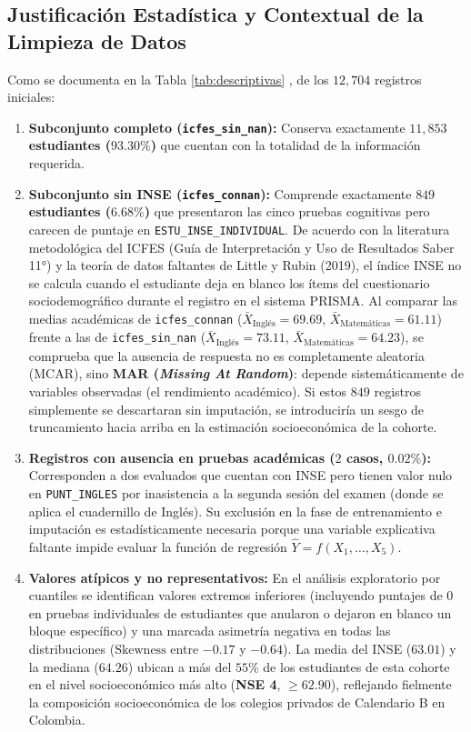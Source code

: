 \documentclass[11pt,letterpaper]{article}
\begin{document}
\subsection{Justificación Estadística y Contextual de la Limpieza de Datos}
Como se documenta en la Tabla \ref{tab:descriptivas} , de los $12,704$ registros iniciales:
\begin{enumerate}
    \item \textbf{Subconjunto completo (\texttt{icfes\_sin\_nan}):} Conserva exactamente \textbf{$11,853$ estudiantes ($93.30\%$)} que cuentan con la totalidad de la información requerida.
    \item \textbf{Subconjunto sin INSE (\texttt{icfes\_connan}):} Comprende exactamente \textbf{$849$ estudiantes ($6.68\%$)} que presentaron las cinco pruebas cognitivas pero carecen de puntaje en \texttt{ESTU\_INSE\_INDIVIDUAL}. De acuerdo con la literatura metodológica del ICFES (Guía de Interpretación y Uso de Resultados Saber 11°) y la teoría de datos faltantes de Little y Rubin (2019), el índice INSE no se calcula cuando el estudiante deja en blanco los ítems del cuestionario sociodemográfico durante el registro en el sistema PRISMA. Al comparar las medias académicas de \texttt{icfes\_connan} ($\bar{X}_{\text{Inglés}} = 69.69$, $\bar{X}_{\text{Matemáticas}} = 61.11$) frente a las de \texttt{icfes\_sin\_nan} ($\bar{X}_{\text{Inglés}} = 73.11$, $\bar{X}_{\text{Matemáticas}} = 64.23$), se comprueba que la ausencia de respuesta no es completamente aleatoria (MCAR), sino \textbf{MAR (\textit{Missing At Random})}: depende sistemáticamente de variables observadas (el rendimiento académico). Si estos $849$ registros simplemente se descartaran sin imputación, se introduciría un sesgo de truncamiento hacia arriba en la estimación socioeconómica de la cohorte.
    \item \textbf{Registros con ausencia en pruebas académicas ($2$ casos, $0.02\%$):} Corresponden a dos evaluados que cuentan con INSE pero tienen valor nulo en \texttt{PUNT\_INGLES} por inasistencia a la segunda sesión del examen (donde se aplica el cuadernillo de Inglés). Su exclusión en la fase de entrenamiento e imputación es estadísticamente necesaria porque una variable explicativa faltante impide evaluar la función de regresión $\hat{Y} = f(X_1, \dots, X_5)$.
    \item \textbf{Valores atípicos y no representativos:} En el análisis exploratorio por cuantiles se identifican valores extremos inferiores (incluyendo puntajes de $0$ en pruebas individuales de estudiantes que anularon o dejaron en blanco un bloque específico) y una marcada asimetría negativa en todas las distribuciones ($\text{Skewness}$ entre $-0.17$ y $-0.64$). La media del INSE ($63.01$) y la mediana ($64.26$) ubican a más del $55\%$ de los estudiantes de esta cohorte en el nivel socioeconómico más alto (\textbf{NSE 4}, $\ge 62.90$), reflejando fielmente la composición socioeconómica de los colegios privados de Calendario B en Colombia.
\end{enumerate}
\end{document}
